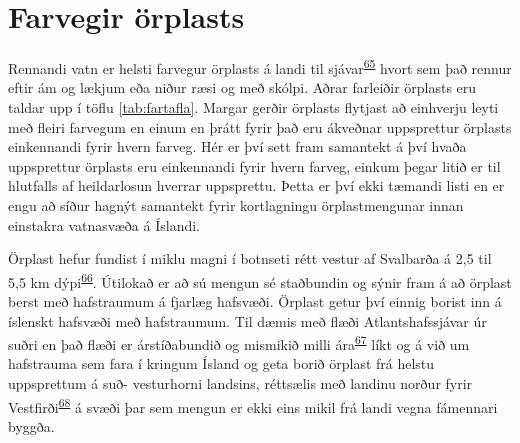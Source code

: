 \documentclass[icelandic,]{book}
\begin{document}
\hypertarget{farvegir-orplasts}{%
\chapter{Farvegir örplasts}\label{farvegir-orplasts}}

Rennandi vatn er helsti farvegur örplasts á landi til sjávar\textsuperscript{\protect\hyperlink{ref-unice2019characterizing1}{65}} hvort sem það rennur eftir ám og lækjum eða niður ræsi og með skólpi. Aðrar farleiðir örplasts eru taldar upp í töflu \ref{tab:fartafla}. Margar gerðir örplasts flytjast að einhverju leyti með fleiri farvegum en einum en þrátt fyrir það eru ákveðnar uppsprettur örplasts einkennandi fyrir hvern farveg. Hér er því sett fram samantekt á því hvaða uppsprettur örplasts eru einkennandi fyrir hvern farveg, einkum þegar litið er til hlutfalls af heildarlosun hverrar uppsprettu. Þetta er því ekki tæmandi listi en er engu að síður hagnýt samantekt fyrir kortlagningu örplastmengunar innan einstakra vatnasvæða á Íslandi.

Örplast hefur fundist í miklu magni í botnseti rétt vestur af Svalbarða á 2,5 til 5,5 km dýpi\textsuperscript{\protect\hyperlink{ref-Bergmann2017}{66}}. Útilokað er að sú mengun sé staðbundin og sýnir fram á að örplast berst með hafstraumum á fjarlæg hafsvæði. Örplast getur því einnig borist inn á íslenskt hafsvæði með hafstraumum. Til dæmis með flæði Atlantshafssjávar úr suðri en það flæði er árstíðabundið og mismikið milli ára\textsuperscript{\protect\hyperlink{ref-Strait2005a}{67}} líkt og á við um hafstrauma sem fara í kringum Ísland og geta borið örplast frá helstu uppsprettum á suð- vesturhorni landsins, réttsælis með landinu norður fyrir Vestfirði\textsuperscript{\protect\hyperlink{ref-Astthorsson1994}{68}} á svæði þar sem mengun er ekki eins mikil frá landi vegna fámennari byggða.
\end{document}
